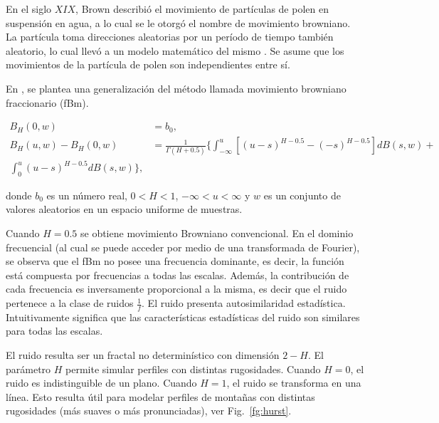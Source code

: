 En el siglo $XIX$, Brown describió el movimiento de partículas de polen en suspensión en agua, a lo cual se le otorgó el nombre de movimiento browniano.
La partícula toma direcciones aleatorias por un período de tiempo también aleatorio, lo cual llevó a un modelo matemático del mismo \cite{}.
Se asume que los movimientos de la partícula de polen son independientes entre sí.

En \cite{Mandelbrot1968}, se plantea una generalización del método llamada movimiento browniano fraccionario (fBm). 

\begin{equation}
\begin{aligned}
B_{H}(0,w) &= b_{0},\\
B_{H}(u,w)- B_{H}(0,w) &= \frac{1}{\Gamma(H+0.5)} \big\{ \int_{-\infty}^{u} [(u-s)^{H-0.5} - (-s)^{H-0.5} ] dB(s,w) + \\
 \int_{0}^{u} (u-s)^{H-0.5} dB(s,w) \big \},
\end{aligned}
\end{equation}

donde $b_{0}$ es un número real, $0 < H < 1$, $-\infty < u < \infty $ y $w$ es un conjunto de valores aleatorios en un espacio uniforme de muestras.

Cuando $H = 0.5$ se obtiene movimiento Browniano convencional.
En el dominio frecuencial (al cual se puede acceder por medio de una transformada de Fourier), se observa que el fBm no posee una frecuencia dominante, es decir, la función está compuesta por frecuencias a todas las escalas.
Además, la contribución de cada frecuencia es inversamente proporcional a la misma, es decir que el ruido pertenece a la clase de ruidos $\frac{1}{f}$.
El ruido presenta autosimilaridad estadística.
Intuitivamente significa que las características estadísticas del ruido son similares para todas las escalas.

El ruido resulta ser un fractal no determinístico con dimensión $2-H$.
El parámetro $H$ permite simular perfiles con distintas rugosidades.
Cuando $H = 0$, el ruido es indistinguible de un plano.
Cuando $H = 1$, el ruido se transforma en una línea.
Esto resulta útil para modelar perfiles de montañas con distintas rugosidades (más suaves o más pronunciadas), ver Fig.~\ref{fg:hurst}.


